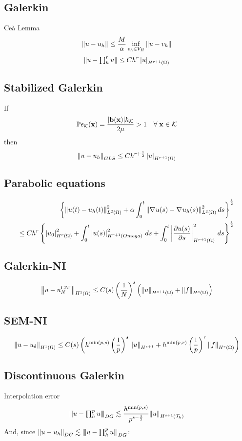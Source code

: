 \documentclass[a4paper,11pt]{article}
\theoremstyle{break}
\renewcommand*{\grad}{\nabla\mspace{1mu}}
\newcommand{\vect}[1]{\textbf{#1}}
\newcommand*{\txt}[1]{\text{#1}}
\newcommand*{\seminorm}[2]{\left\lvert#1\right\rvert_{#2}}
\newcommand*{\threenorm}[3][\null]{\left\lvert\mspace{-2mu}\left\lvert\mspace{-2mu}\left\lvert#2\right\rvert\mspace{-2mu}\right\rvert\mspace{-2mu}\right\rvert_{#3}^{#1}}
\newcommand{\ltwonorm}[1]{\norm{#1}_{L^2(\Omega)}}
\newcommand{\element}{\mathcal{K}}
\newcommand{\triangulation}{\mathcal{T}_h}
\newcommand{\peclet}{\mathbb{P}e}
\newcommand{\xvec}{\vect{x}}
\newcommand{\onehalf}{\frac{1}{2}}
\numberwithin{equation}{section}
\begin{document}
\subsection*{Galerkin} 
Ceà Lemma 
\[
    \norm{u-u_h} \leq \frac{M}{\alpha} \inf_{v_h \in V_H} \norm{u-v_h}
\]
\[
    \norm{u- \textstyle \prod_{h}^{r}u} \leq C h^r\seminorm{u}{H^{r+1}(\Omega)}
\]
\subsection*{Stabilized Galerkin}
If 
\[
    \peclet_\element(\xvec) = \frac{\abs{\vect{b}(\xvec)} h_\element}{2\mu} > 1 \quad \forall \; \xvec \in \element
\]
then 
\[
    \norm{u - u_h}_{GLS} \leq Ch^{r+\onehalf} \seminorm{u}{H^{r+1}(\Omega)}
\]
\subsection*{Parabolic equations}
\begin{equation*}
    \begin{split}
        \left\{ \ltwonorm{u(t) - u_h(t)}^2 + \alpha \int_0^t \ltwonorm{\grad u(s) -\grad u_h(s)}^2 \, ds \right\}^{\onehalf} \\
        \leq Ch^r \left\{ \seminorm{u_0}{H^r(\Omega)}^2 + \int_0^t \seminorm{u(s)}{H^{r+1}( Omega)}^2 \, ds + \int_0^t \seminorm{\partialderivative{u(s)}{s}}{H^{r+1}(\Omega)}^2 \, ds \right\}^{\onehalf}
    \end{split}
\end{equation*}
\subsection*{Galerkin-NI}
\[
    \norm{u-u_N^{\txt{GNI}}}_{H^1(\Omega)} \leq C(s) \left(\frac{1}{N}\right)^s \left(\norm{u}_{H^{s+1}(\Omega)}+\norm{f}_{H^s(\Omega)}\right)
\]
\subsection*{SEM-NI}
\[
    \norm{u - u_\delta}_{H^1(\Omega)} \leq C(s) \left( h^{\min(p,s)} \left( \frac{1}{p} \right)^s \norm{u}_{H^{s+1}} + h^{\min(p,r)}\left( \frac{1}{p} \right)^r \norm{f}_{H^r(\Omega)} \right)
\]
\subsection*{Discontinuous Galerkin}
Interpolation error 
\[
    \threenorm{u-\textstyle\prod_h^p u}{DG} \lesssim \frac{h^{\min(p,s)}}{p^{s-\onehalf}}\norm{u}_{H^{s+1}(\triangulation)}
\]
And, since \( \norm{u-u_h}_{DG} \lesssim \threenorm{u-\textstyle\prod_h^p u}{DG}\):
\end{document}
